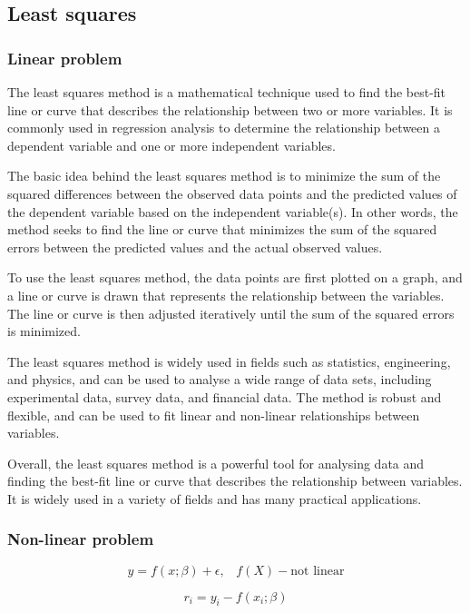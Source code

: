 \documentclass[12pt,twoside]{extarticle}
\begin{document}

\subsection{Least squares}
\subsubsection{Linear problem}
The least squares method is a mathematical technique used to find the best-fit line or curve that describes the relationship between two or more variables. It is commonly used in regression analysis to determine the relationship between a dependent variable and one or more independent variables.

The basic idea behind the least squares method is to minimize the sum of the squared differences between the observed data points and the predicted values of the dependent variable based on the independent variable(s). In other words, the method seeks to find the line or curve that minimizes the sum of the squared errors between the predicted values and the actual observed values.

To use the least squares method, the data points are first plotted on a graph, and a line or curve is drawn that represents the relationship between the variables. The line or curve is then adjusted iteratively until the sum of the squared errors is minimized.

The least squares method is widely used in fields such as statistics, engineering, and physics, and can be used to analyse a wide range of data sets, including experimental data, survey data, and financial data. The method is robust and flexible, and can be used to fit linear and non-linear relationships between variables.

Overall, the least squares method is a powerful tool for analysing data and finding the best-fit line or curve that describes the relationship between variables. It is widely used in a variety of fields and has many practical applications.

\subsubsection{Non-linear problem}
\begin{equation}
    y = f(x;\beta) + \epsilon,\,\,\,\,\,f(X) - \text{not linear}
\end{equation}

\begin{equation}
    r_i = y_i - f(x_i;\beta)
\end{equation}
\end{document}
